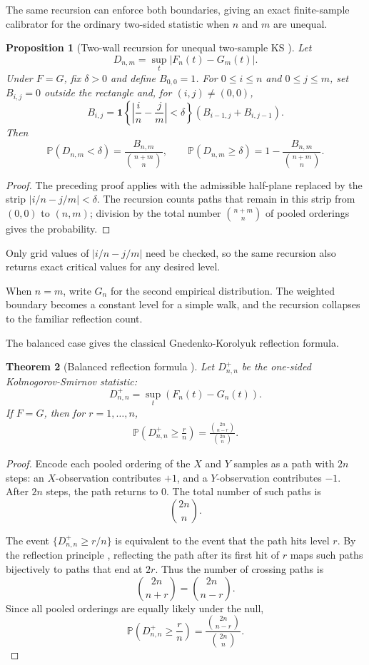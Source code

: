 \documentclass[12pt]{article}
\newtheorem{theorem}{Theorem}
\newtheorem{proposition}[theorem]{Proposition}
\theoremstyle{remark}
\begin{document}
The same recursion can enforce both boundaries, giving an exact finite-sample
calibrator for the ordinary two-sided statistic when $n$ and $m$ are unequal.

\begin{proposition}[Two-wall recursion for unequal two-sample KS \cite{feller1968introduction}]
\label{prop:two-wall-recursion}
Let
\[
D_{n,m}=\sup_t|F_n(t)-G_m(t)|.
\]
Under $F=G$, fix $\delta>0$ and define $B_{0,0}=1$. For $0\le i\le n$ and
$0\le j\le m$, set $B_{i,j}=0$ outside the rectangle and, for $(i,j)\ne(0,0)$,
\[
B_{i,j}=
\mathbf{1}\left\{\left|\frac{i}{n}-\frac{j}{m}\right|<\delta\right\}
\left(B_{i-1,j}+B_{i,j-1}\right).
\]
Then
\[
\mathbb{P}\left(D_{n,m}<\delta\right)
=\frac{B_{n,m}}{\binom{n+m}{n}},
\qquad
\mathbb{P}\left(D_{n,m}\ge\delta\right)
=1-\frac{B_{n,m}}{\binom{n+m}{n}}.
\]
\end{proposition}

\begin{proof}
The preceding proof applies with the admissible half-plane replaced by the
strip $|i/n-j/m|<\delta$. The recursion counts paths that remain in this strip
from $(0,0)$ to $(n,m)$; division by the total number $\binom{n+m}{n}$ of
pooled orderings gives the probability.
\end{proof}

Only grid values of $|i/n-j/m|$ need be checked, so the same recursion also
returns exact critical values for any desired level.

When $n=m$, write $G_n$ for the second empirical distribution. The weighted
boundary becomes a constant level for a simple walk, and the recursion collapses
to the familiar reflection count.

The balanced case gives the classical Gnedenko-Korolyuk reflection formula.

\begin{theorem}[Balanced reflection formula \cite{feller1968introduction}]
    Let $D_{n,n}^{+}$ be the one-sided Kolmogorov-Smirnov statistic:
    \[
    D_{n,n}^+=\sup_{t}\left(F_n(t)-G_n(t)\right).
    \]
    If $F=G$, then for $r=1,\ldots,n$,
    \begin{align}
        \mathbb{P}\left(D_{n,n}^+\ge\frac{r}{n}\right)
        =\frac{\binom{2n}{n-r}}{\binom{2n}{n}}.
    \end{align}
\end{theorem}
\begin{proof}
Encode each pooled ordering of the $X$ and $Y$ samples as a path with $2n$
steps: an $X$-observation contributes $+1$, and a $Y$-observation contributes
$-1$. After $2n$ steps, the path returns to $0$. The total number of such
paths is
\[
\binom{2n}{n}.
\]

The event $\{D_{n,n}^+\ge r/n\}$ is equivalent to the event that the path
hits level $r$. By the reflection principle \cite{feller1968introduction},
reflecting the path after its first hit of $r$ maps such paths bijectively
to paths that end at $2r$. Thus the number of crossing paths is
\[
\binom{2n}{n+r}=\binom{2n}{n-r}.
\]
Since all pooled orderings are equally likely under the null,
\[
\mathbb{P}\left(D_{n,n}^+\ge\frac{r}{n}\right)
=\frac{\binom{2n}{n-r}}{\binom{2n}{n}}.
\]
\end{proof}
\end{document}
